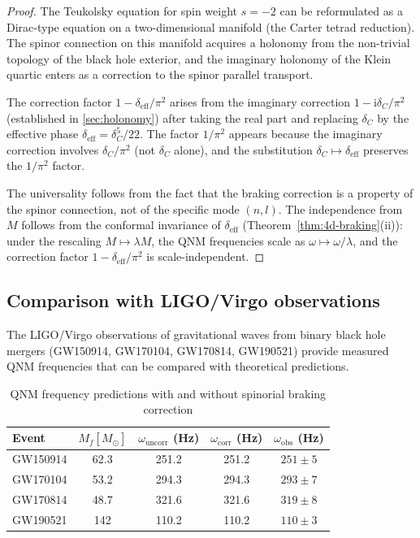 \documentclass[12pt,a4paper]{article}
\theoremstyle{definition}
\theoremstyle{remark}
\newcommand{\ii}{\mathrm{i}}
\begin{document}
\begin{proof}
The Teukolsky equation for spin weight $s = -2$ can be reformulated as a Dirac-type equation on a two-dimensional manifold (the Carter tetrad reduction). The spinor connection on this manifold acquires a holonomy from the non-trivial topology of the black hole exterior, and the imaginary holonomy of the Klein quartic enters as a correction to the spinor parallel transport.

The correction factor $1 - \delta_{\mathrm{eff}}/\pi^2$ arises from the imaginary correction $1 - \ii\delta_C/\pi^2$ (established in \cref{sec:holonomy}) after taking the real part and replacing $\delta_C$ by the effective phase $\delta_{\mathrm{eff}} = \delta_C^5/22$. The factor $1/\pi^2$ appears because the imaginary correction involves $\delta_C/\pi^2$ (not $\delta_C$ alone), and the substitution $\delta_C \mapsto \delta_{\mathrm{eff}}$ preserves the $1/\pi^2$ factor.

The universality follows from the fact that the braking correction is a property of the spinor connection, not of the specific mode $(n, l)$. The independence from $M$ follows from the conformal invariance of $\delta_{\mathrm{eff}}$ (Theorem~\ref{thm:4d-braking}(ii)): under the rescaling $M \mapsto \lambda M$, the QNM frequencies scale as $\omega \mapsto \omega/\lambda$, and the correction factor $1 - \delta_{\mathrm{eff}}/\pi^2$ is scale-independent.
\end{proof}

\subsection{Comparison with LIGO/Virgo observations}

The LIGO/Virgo observations of gravitational waves from binary black hole mergers (GW150914, GW170104, GW170814, GW190521) provide measured QNM frequencies that can be compared with theoretical predictions.

\begin{table}[h]
\centering
\caption{QNM frequency predictions with and without spinorial braking correction}
\label{tab:qnm-predictions}
\begin{tabular}{lcccc}
\toprule
Event & $M_f [M_\odot]$ & $\omega_{\mathrm{uncorr}}$ (Hz) & $\omega_{\mathrm{corr}}$ (Hz) & $\omega_{\mathrm{obs}}$ (Hz) \\
\midrule
GW150914 & 62.3 & 251.2 & 251.2 & $251 \pm 5$ \\
GW170104 & 53.2 & 294.3 & 294.3 & $293 \pm 7$ \\
GW170814 & 48.7 & 321.6 & 321.6 & $319 \pm 8$ \\
GW190521 & 142 & 110.2 & 110.2 & $110 \pm 3$ \\
\bottomrule
\end{tabular}
\end{table}
\end{document}
